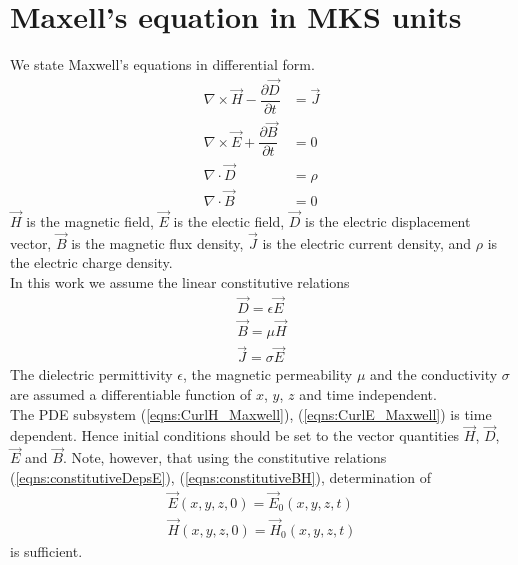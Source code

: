\documentclass[12pt,twoside]{report}
\begin{document}
\section{Maxell's equation in MKS units}
We state Maxwell's equations in differential form.
\begin{subequations}

	\begin{align}
        \nabla \times \overrightarrow{H}-\dfrac{\partial \overrightarrow{D}}{\partial t} &= \overrightarrow{J}  \label{eqns:CurlH_Maxwell}	\\	
        \nabla \times \overrightarrow{E} + \dfrac{\partial \overrightarrow{B}}{\partial t}&= 0  \label{eqns:CurlE_Maxwell} \\
		\nabla \cdot \overrightarrow{D} &=  \rho	 \label{eqns:DivD_Maxwell}\\		
		\nabla \cdot \overrightarrow{B} &= 0	
	\end{align}
\end{subequations}
$\overrightarrow{H}$ is the magnetic field, $\overrightarrow{E}$ is the electic field, $\overrightarrow{D}$ is the electric displacement vector, $\overrightarrow{B}$ is the magnetic flux density, $\overrightarrow{J}$ is the electric current density, and $\rho$ is the electric charge density.\\
In this work we assume the linear constitutive relations 
\begin{subequations}
\begin{align}
        \overrightarrow{D} = \epsilon \overrightarrow{E} \label{eqns:constitutiveDepsE}\\
        \overrightarrow{B} = \mu \overrightarrow{H}	\label{eqns:constitutiveBH}\\
        \overrightarrow{J} = \sigma \overrightarrow{E}
\end{align}
\end{subequations}
The dielectric permittivity $\epsilon$, the magnetic permeability $\mu$ and the conductivity $\sigma$ are assumed a differentiable function of $x$, $y$, $z$ and time independent.\\
The PDE subsystem (\ref{eqns:CurlH_Maxwell}), (\ref{eqns:CurlE_Maxwell}) is time dependent. Hence initial conditions should be set to the vector quantities $\overrightarrow{H}$, $\overrightarrow{D}$, $\overrightarrow{E}$ and $\overrightarrow{B}$. Note, however, that using the constitutive relations (\ref{eqns:constitutiveDepsE}), (\ref{eqns:constitutiveBH}), determination of
\begin{subequations}
\begin{align}
\label{eqns:MaxwellSysInitCondE}
\overrightarrow{E}(x,y,z,0) = \overrightarrow{E}_0(x,y,z,t)\\
\label{eqns:MaxwellSysInitCondH}
\overrightarrow{H}(x,y,z,0) = \overrightarrow{H}_0(x,y,z,t)
\end{align}
\end{subequations}
is sufficient.
\end{document}
